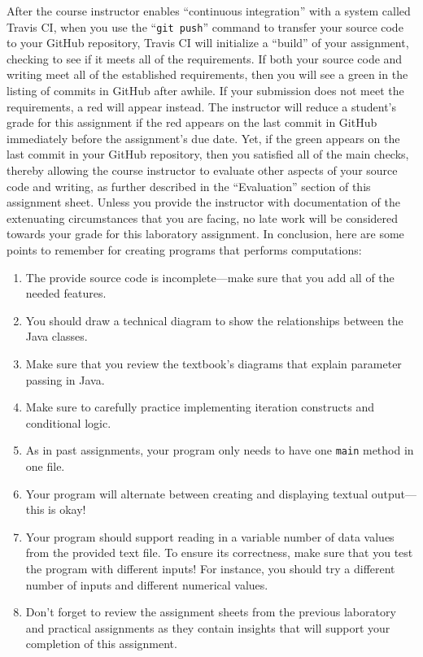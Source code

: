 \documentclass[11pt]{article}
\newcommand{\gitpush}{\command{git push}}
\newcommand{\command}[1]{``\lstinline{#1}''}
\newcommand{\step}[1]{``{#1}''}
\newcommand{\checkmark}{\ding{51}}
\newcommand{\naughtmark}{\ding{55}}
\begin{document}
After the course instructor enables \step{continuous integration} with a system
called Travis CI, when you use the \gitpush{} command to transfer your source
code to your GitHub repository, Travis CI will initialize a \step{build} of your
assignment, checking to see if it meets all of the requirements. If both your
source code and writing meet all of the established requirements, then you will
see a green \checkmark{} in the listing of commits in GitHub after awhile. If
your submission does not meet the requirements, a red \naughtmark{} will appear
instead. The instructor will reduce a student's grade for this assignment if the
red \naughtmark{} appears on the last commit in GitHub immediately before the
assignment's due date. Yet, if the green \checkmark{} appears on the last commit
in your GitHub repository, then you satisfied all of the main checks, thereby
allowing the course instructor to evaluate other aspects of your source code and
writing, as further described in the \step{Evaluation} section of this
assignment sheet. Unless you provide the instructor with documentation of the
extenuating circumstances that you are facing, no late work will be considered
towards your grade for this laboratory assignment. In conclusion, here are some
points to remember for creating programs that performs computations:

\begin{enumerate}
  \setlength{\itemsep}{0pt}

\item The provide source code is incomplete---make sure that you add all of the needed features.

\item You should draw a technical diagram to show the relationships between the Java classes.

\item Make sure that you review the textbook's diagrams that explain parameter
  passing in Java.

\item Make sure to carefully practice implementing iteration constructs and
  conditional logic.

\item As in past assignments, your program only needs to have one {\tt main} method in one file.

\item Your program will alternate between creating and displaying textual output---this is okay!

\item Your program should support reading in a variable number of data values
  from the provided text file. To ensure its correctness, make sure that you
  test the program with different inputs! For instance, you should try a
  different number of inputs and different numerical values.

\item Don't forget to review the assignment sheets from the previous laboratory
  and practical assignments as they contain insights that will support your
  completion of this assignment.

\end{enumerate}
\end{document}
